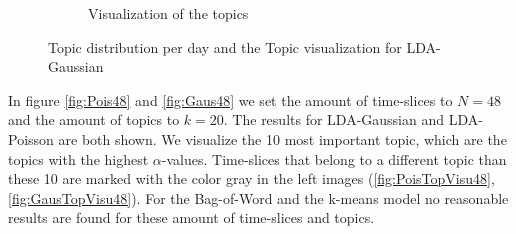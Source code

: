 \documentclass[11pt,a4paper]{article}
\begin{document}
\begin{figure}[h!]
\begin{subfigure}[b]{0.45\linewidth}
  \caption{Visualization of the topics}
  \label{fig:GausTopVisu96}
 \end{subfigure}
 \caption{Topic distribution per day and the Topic visualization for LDA-Gaussian}
 \label{fig:Gaus96}
\end{figure}

In figure \ref{fig:Pois48} and \ref{fig:Gaus48} we set the amount of time-slices to $N=48$ and the amount of topics to $k=20$. The results for LDA-Gaussian and LDA-Poisson are both shown. We visualize the 10 most important topic, which are the topics with the highest $\alpha$-values. Time-slices that belong to a different topic than these 10 are marked with the color gray in the left images (\ref{fig:PoisTopVisu48}, \ref{fig:GausTopVisu48}).
For the Bag-of-Word and the k-means model no reasonable results are found for these amount of time-slices and topics.	
\end{document}
